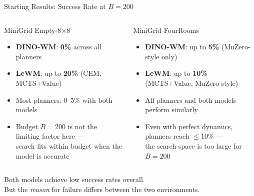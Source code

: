 \documentclass[aspectratio=169, 11pt]{beamer}
\newcommand{\lewm}{\textcolor{LeWMc}{\textbf{LeWM}}\xspace}
\newcommand{\dino}{\textcolor{DINOc}{\textbf{DINO-WM}}\xspace}
\begin{document}
\begin{frame}{Starting Results: Success Rate at $B = 200$}

  \begin{columns}[T]

    \begin{block}{MiniGrid Empty-8$\times$8}
      \begin{itemize}
        \item \dino: \textbf{0\%} across all planners
        \item \lewm: up to \textbf{20\%} (CEM, MCTS+Value)
        \item Most planners: 0--5\% with both models
        \item Budget $B = 200$ is not the limiting factor here —\\
              search fits within budget when the model is accurate
      \end{itemize}
    \end{block}

    \begin{block}{MiniGrid FourRooms}
      \begin{itemize}
        \item \dino: up to \textbf{5\%} (MuZero-style only)
        \item \lewm: up to \textbf{10\%} (MCTS+Value, MuZero-style)
        \item All planners and both models perform similarly
        \item Even with perfect dynamics, planners reach $\leq 10\%$ —\\
              the search space is too large for $B = 200$
      \end{itemize}
    \end{block}

  \end{columns}

  \vspace{1em}
  \begin{center}
    Both models achieve low success rates overall.\\
    But the \emph{reason} for failure differs between the two environments.
  \end{center}

\end{frame}
\end{document}

